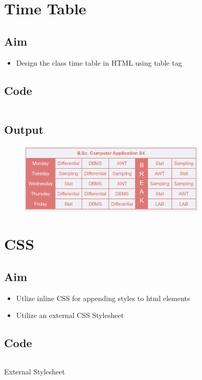 \documentclass{article}
\begin{document}
  \section{Time Table}
    \subsection*{Aim}
    \begin{itemize}
      \item Design the class time table in HTML using table tag
    \end{itemize}

    \subsection*{Code}
      \inputminted[frame=lines, linenos, breaklines, breakanywhere, numberblanklines=false]{html}{./prog_2/index.html}

    \subsection*{Output}
    \begin{figure}[h!]
    \centering
    \includegraphics[width=0.8\textwidth]{./Assets/p0201.png}
    \end{figure}
  \newpage

  \section{CSS}
    \subsection*{Aim}
    \begin{itemize}
      \item Utlize inline CSS for appending styles to html elements
      \item Utilize an external CSS Stylesheet
    \end{itemize}

    \subsection*{Code}
      \inputminted[frame=lines, linenos, breaklines, breakanywhere, numberblanklines=false]{html}{./prog_3/index.html}
      External Stylesheet
      \inputminted[frame=lines, linenos, breaklines, breakanywhere, numberblanklines=false]{css}{./prog_3/styles.css}
\end{document}
